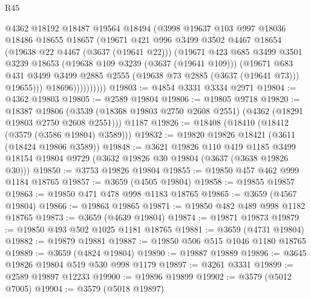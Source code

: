 \begin{lexlean}{R45}
\begin{coremodule}
                      @4362
                      @18192
                      @18487
                      @19564
                      @18494
                      (@3998
                        @19637
                        @103
                        @997
                        @18036
                        @18486
                        @18655
                        @18657
                        (@19671
                          @421
                          @996
                          @3499
                          @3502
                          @4467
                          @18654
                          (@19638 @22 @4467 (@3637 (@19641 @22)))
                          (@19671
                            @423
                            @685
                            @3499
                            @3501
                            @3239
                            @18653
                            (@19638 @109 @3239 (@3637 (@19641 @109)))
                            (@19671
                              @683
                              @431
                              @3499
                              @3499
                              @2885
                              @2555
                              (@19638 @73 @2885 (@3637 (@19641 @73)))
                              @19655)))
                        @18696))))))))))
@19803 := @4854 @3331 @3334 @2971
@19804 := @4362 @19803
@19805 := @2589 @19804
@19806 := @19805 @9718
@19820 := @18387
    @19806
    (@3539 (@18368 @19803 @2750 @2608 @2551) (@4362 (@18291 @19803 @2750 @2608 @2551)))
    @1187
@19826 := @18408 (@18410 (@18412 (@3579 (@3586 @19804) @3589)))
@19832 := @19820 @19826 @18421 (@3611 (@18424 @19806 @3589))
@19848 := @3621
    @19826
    @110
    @419
    @1185
    @3499
    @18154
    @19804
    @9729
    (@3632 @19826 @30 @19804 (@3637 (@3638 @19826 @30)))
@19850 := @3753 @19826 @19804
@19855 := @19850 @457 @462 @999 @1184 @18765
@19857 := @3659 (@4505 @19804)
@19858 := @19855 @19857
@19863 := @19850 @471 @478 @998 @1183 @18765
@19865 := @3659 (@4567 @19804)
@19866 := @19863 @19865
@19871 := @19850 @482 @489 @998 @1182 @18765
@19873 := @3659 (@4639 @19804)
@19874 := @19871 @19873
@19879 := @19850 @493 @502 @1025 @1181 @18765
@19881 := @3659 (@4731 @19804)
@19882 := @19879 @19881
@19887 := @19850 @506 @515 @1046 @1180 @18765
@19889 := @3659 (@4824 @19804)
@19890 := @19887 @19889
@19896 := @3645 @19826 @19804 @519 @530 @998 @1179
@19897 := @3261 @3331
@19899 := @2589 @19897 @12233
@19900 := @19896 @19899
@19902 := @3579 (@5012 @7005)
@19904 := @3579 (@5018 @19897)

\end{coremodule}
\end{lexlean}
